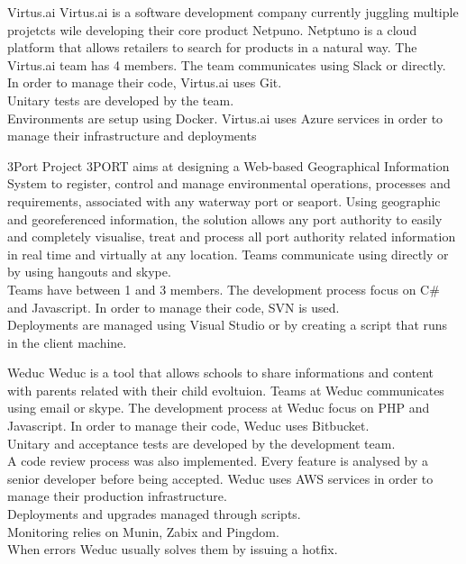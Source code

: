     \begin{companyreport}{Virtus.ai}
      \product
      Virtus.ai is a software development company currently juggling multiple projetcts wile developing their core product Netpuno. Netptuno is a cloud platform that allows retailers to search for products in a natural way.
      \teams
      The Virtus.ai team has 4 members. The team communicates using Slack or directly.
      \development
      In order to manage their code, Virtus.ai uses Git. \\
      Unitary tests are developed by the team. \\
      Environments are setup using Docker.
      \operations
      Virtus.ai uses Azure services in order to manage their infrastructure and deployments
      \reportend
    \end{companyreport}
    \begin{companyreport}{3Port}
      \product
      Project 3PORT aims at designing a Web-based Geographical Information System to register, control and manage environmental operations, processes and requirements, associated with any waterway port or seaport. Using geographic and georeferenced information, the solution allows any port authority to easily and completely visualise, treat and process all port authority related information in real time and virtually at any location.
      \teams
      Teams communicate using directly or by using hangouts and skype.\\
      Teams have between 1 and 3 members.
      \development
       The development process focus on C\# and Javascript. In order to manage their code, SVN is used. \\
      \operations
      Deployments are managed using Visual Studio or by creating a script that runs in the client machine.
      \reportend
    \end{companyreport}
    \begin{companyreport}{Weduc}
      \product
      Weduc is a tool that allows schools to share informations and content with parents related with their child evoltuion.
      \teams
      Teams at Weduc communicates using email or skype.
      \development
      The development process at Weduc focus on PHP and Javascript. In order to manage their code, Weduc uses Bitbucket. \\
      Unitary and acceptance tests are developed by the development team.\\
      A code review process was also implemented. Every feature is analysed by a senior developer before being accepted.
      \operations
      Weduc uses AWS services in order to manage their production infrastructure. \\
      Deployments and upgrades managed through scripts. \\
      Monitoring relies on Munin, Zabix and Pingdom. \\
      When errors Weduc usually solves them by issuing a hotfix.
      \reportend
    \end{companyreport}

